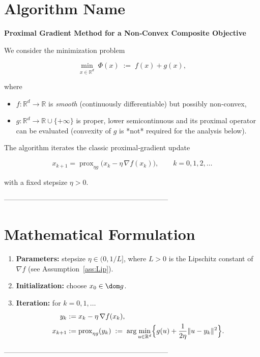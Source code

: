\documentclass{article}
\newcommand{\prox}{\operatorname{prox}}
\newcommand{\grad}{\nabla}
\newcommand{\R}{\mathbb{R}}
\begin{document}
\section*{Algorithm Name}
\textbf{Proximal Gradient Method for a Non‑Convex Composite Objective}  

We consider the minimization problem  

\[
\min_{x\in\R^{d}} \; \Phi(x)\;:=\; f(x)+g(x),
\tag{P}
\]

where  

\begin{itemize}[noitemsep]
\item $f:\R^{d}\rightarrow\R$ is \emph{smooth} (continuously differentiable) but possibly non‑convex,
\item $g:\R^{d}\rightarrow\R\cup\{+\infty\}$ is proper, lower semicontinuous and its proximal operator can be evaluated (convexity of $g$ is *not* required for the analysis below).
\end{itemize}

The algorithm iterates the classic proximal‑gradient update  

\[
x_{k+1}= \prox_{\eta g}\!\bigl(x_{k}-\eta\,\grad f(x_{k})\bigr),
\qquad k=0,1,2,\dots
\tag{1}
\]

with a fixed stepsize $\eta>0$.

---------------------------------------------------------------------

\section*{Mathematical Formulation}
\begin{enumerate}
\item \textbf{Parameters:} stepsize $\eta\in(0,1/L]$, where $L>0$ is the Lipschitz constant of $\grad f$ (see Assumption~\ref{ass:Lip}).
\item \textbf{Initialization:} choose $x_{0}\in\dom g$.
\item \textbf{Iteration:} for $k=0,1,\dots$
\begin{align}
y_{k} &:= x_{k}-\eta\,\grad f(x_{k}),\label{eq:y}\\
x_{k+1}&:= \prox_{\eta g}(y_{k})\;:=\;\arg\min_{u\in\R^{d}}
\Bigl\{g(u)+\frac{1}{2\eta}\|u-y_{k}\|^{2}\Bigr\}.\label{eq:prox}
\end{align}
\end{enumerate}

---------------------------------------------------------------------
\end{document}
